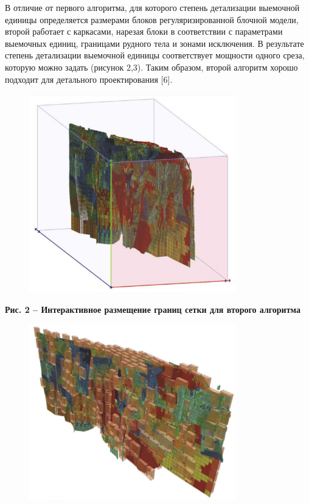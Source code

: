 В отличие от первого алгоритма, для которого степень детализации
выемочной единицы определяется размерами блоков регуляризированной
блочной модели, второй работает с каркасами, нарезая блоки в
соответствии с параметрами выемочных единиц, границами рудного тела и
зонами исключения. В результате степень детализации выемочной единицы
соответствует мощности одного среза, которую можно задать (рисунок 2,3).
Таким образом, второй алгоритм хорошо подходит для детального
проектирования {[}6{]}.

\begin{figure}[H]
	\centering
	\includegraphics[width=0.8\textwidth]{assets/1251}
	\caption*{}
\end{figure}

{\bfseries Рис. 2 -- Интерактивное размещение границ сетки для второго
алгоритма}

\begin{figure}[H]
	\centering
	\includegraphics[width=0.8\textwidth]{assets/1252}
	\caption*{}
\end{figure}

